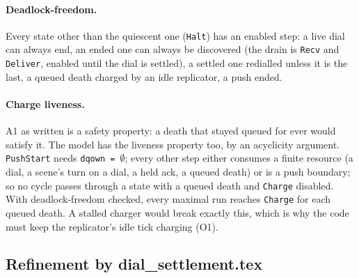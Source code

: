 \documentclass[a4paper,10pt,fleqn]{article}
\begin{document}
\paragraph{Deadlock-freedom.}
Every state other than the quiescent one (\texttt{Halt}) has an enabled step: a
live dial can always end, an ended one can always be discovered (the drain is \texttt{Recv} and \texttt{Deliver}, enabled until the dial is
settled), a settled one redialled
unless it is the last, a queued death charged by an idle replicator, a push
ended.

\paragraph{Charge liveness.}
A1 as written is a safety property: a death that stayed queued for ever would
satisfy it.  The model has the liveness property too, by an acyclicity argument.
\texttt{PushStart} needs \texttt{dqown = $\emptyset$}; every other step either
consumes a finite resource (a dial, a scene's turn on a dial, a held ack, a
queued death) or is a push boundary; so no cycle passes through a state with a
queued death and \texttt{Charge} disabled.  With deadlock-freedom checked, every
maximal run reaches \texttt{Charge} for each queued death.  A stalled charger
would break exactly this, which is why the code must keep the replicator's idle
tick charging (O1).

\subsection{Refinement by dial\_settlement.tex}
\end{document}
